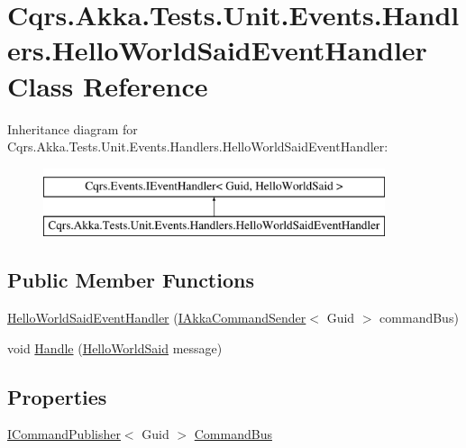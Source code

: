 \hypertarget{classCqrs_1_1Akka_1_1Tests_1_1Unit_1_1Events_1_1Handlers_1_1HelloWorldSaidEventHandler}{}\section{Cqrs.\+Akka.\+Tests.\+Unit.\+Events.\+Handlers.\+Hello\+World\+Said\+Event\+Handler Class Reference}
\label{classCqrs_1_1Akka_1_1Tests_1_1Unit_1_1Events_1_1Handlers_1_1HelloWorldSaidEventHandler}
Inheritance diagram for Cqrs.\+Akka.\+Tests.\+Unit.\+Events.\+Handlers.\+Hello\+World\+Said\+Event\+Handler\+:\begin{figure}[H]
\begin{center}
\leavevmode
\includegraphics[height=2.000000cm]{classCqrs_1_1Akka_1_1Tests_1_1Unit_1_1Events_1_1Handlers_1_1HelloWorldSaidEventHandler}
\end{center}
\end{figure}
\subsection*{Public Member Functions}
\begin{DoxyCompactItemize}
\item 
\hyperlink{classCqrs_1_1Akka_1_1Tests_1_1Unit_1_1Events_1_1Handlers_1_1HelloWorldSaidEventHandler_a0eb8ed23d99a9d434e3bcfdb0ae99e12_a0eb8ed23d99a9d434e3bcfdb0ae99e12}{Hello\+World\+Said\+Event\+Handler} (\hyperlink{interfaceCqrs_1_1Akka_1_1Commands_1_1IAkkaCommandSender}{I\+Akka\+Command\+Sender}$<$ Guid $>$ command\+Bus)
\item 
void \hyperlink{classCqrs_1_1Akka_1_1Tests_1_1Unit_1_1Events_1_1Handlers_1_1HelloWorldSaidEventHandler_accb924e5856731b18120c21daed0f52a_accb924e5856731b18120c21daed0f52a}{Handle} (\hyperlink{classCqrs_1_1Akka_1_1Tests_1_1Unit_1_1Events_1_1HelloWorldSaid}{Hello\+World\+Said} message)
\end{DoxyCompactItemize}
\subsection*{Properties}
\begin{DoxyCompactItemize}
\item 
\hyperlink{interfaceCqrs_1_1Commands_1_1ICommandPublisher}{I\+Command\+Publisher}$<$ Guid $>$ \hyperlink{classCqrs_1_1Akka_1_1Tests_1_1Unit_1_1Events_1_1Handlers_1_1HelloWorldSaidEventHandler_a67473b7f3dc275d04fe079006da89f6c_a67473b7f3dc275d04fe079006da89f6c}{Command\+Bus}
\end{DoxyCompactItemize}


